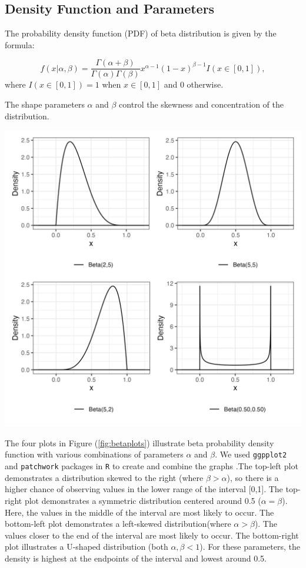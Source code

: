 \documentclass{article}\usepackage[]{graphicx}\usepackage[]{xcolor}
\newenvironment{Figure}
  {\par\medskip\noindent\minipage{\linewidth}}
  {\endminipage\par\medskip}
\begin{document}
\begin{multicols}{2}
\section{Density Function and Parameters}\label{sec:pdf}
The probability density function (PDF) of beta distribution is given by the formula:

\[
 f(x | \alpha, \beta) = \frac{\Gamma(\alpha + \beta)}{\Gamma(\alpha)\Gamma(\beta)} x^{\alpha-1}(1-x)^{\beta-1} I(x \in [0,1]),
\]
where $I(x \in [0,1]) = 1$ when $x \in [0,1]$ and 0 otherwise.

The shape parameters $\alpha$ and $\beta$ control the skewness and concentration of the distribution.


\begin{Figure}
 \centering
 \includegraphics[width=\linewidth]{betaplots.png}
 \label{fig:betaplots}
\end{Figure}

The four plots in Figure (\ref{fig:betaplots}) illustrate beta probability density function with various combinations of parameters $\alpha$ and $\beta$. We used \texttt{ggpplot2} and \texttt{patchwork} packages in \texttt{R} to create and combine the graphs \citep{ggplot2, patchwork}.The top-left plot demonstrates a distribution skewed to the right (where $\beta > \alpha$), so there is a higher chance of observing values in the lower range of the interval [0,1]. The top-right plot demonstrates a symmetric distribution centered around 0.5 ($\alpha = \beta$). Here, the values in the middle of the interval are most likely to occur. The bottom-left plot demonstrates a left-skewed distribution(where $\alpha > \beta$). The values closer to the end of the interval are most likely to occur. The bottom-right plot illustrates a U-shaped distribution (both $\alpha, \beta < 1$). For these parameters, the density is highest at the endpoints of the interval and lowest around 0.5.


\end{multicols}
\end{document}
